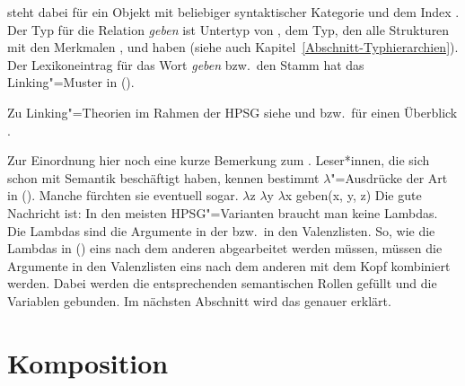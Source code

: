 \z
[] steht dabei für ein Objekt mit beliebiger syntaktischer Kategorie und dem Index
. 
Der Typ für die Relation \emph{geben} ist Untertyp von , dem Typ, den alle
Strukturen mit den Merkmalen \argone, \argtwo und \argthree haben (siehe auch Kapitel~\ref{Abschnitt-Typhierarchien}). 
Der Lexikoneintrag für das Wort \emph{geben} bzw.\ den Stamm  hat das Linking"=Muster in
(). 



Zu Linking"=Theorien im Rahmen der HPSG siehe  und  bzw.\ für
einen Überblick .

Zur Einordnung hier noch eine kurze Bemerkung zum . Leser*innen, die sich schon mit
Semantik beschäftigt haben, kennen bestimmt $\lambda$"=Ausdrücke der Art in (). Manche
fürchten sie eventuell sogar.
\ea
$\lambda$z $\lambda$y $\lambda$x geben(x, y, z)
\z
Die gute Nachricht ist: In den meisten HPSG"=Varianten braucht man keine Lambdas. Die Lambdas sind
die Argumente in der \argstl bzw.\ in den Valenzlisten. So, wie die Lambdas in () eins nach
dem anderen abgearbeitet werden müssen, müssen die Argumente in den Valenzlisten eins nach dem
anderen mit dem Kopf kombiniert werden. Dabei werden die entsprechenden semantischen Rollen gefüllt
und die Variablen gebunden. Im nächsten Abschnitt wird das genauer erklärt.

\section{Komposition}
\label{Abschnitt-Komposition}\label{Semantik-Adjektivmodifikation}


